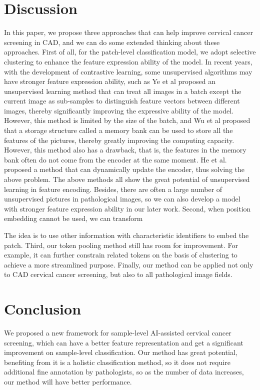 \documentclass[journal,twoside,web]{ieeecolor}
\begin{document}








\section{Discussion}\label{sec:discussion}
In this paper, we propose three approaches that can help improve cervical cancer screening in CAD, and we can do some extended thinking about these approaches. First of all, for the patch-level classification model, we adopt selective clustering to enhance the feature expression ability of the model. In recent years, with the development of contrastive learning, some unsupervised algorithms may have stronger feature expression ability, such as Ye et al\cite{ye2019unsupervised} proposed an unsupervised learning method that can treat all images in a batch except the current image as sub-samples to distinguish feature vectors between different images, thereby significantly improving the expressive ability of the model. However, this method is limited by the size of the batch, and Wu et al\cite{wu2018unsupervised} proposed that a storage structure called a memory bank can be used to store all the features of the pictures, thereby greatly improving the computing capacity. However, this method also has a drawback, that is, the features in the memory bank often do not come from the encoder at the same moment. He et al.\cite{he2020momentum} proposed a method that can dynamically update the encoder, thus solving the above problem. The above methods all show the great potential of unsupervised learning in feature encoding. Besides, there are often a large number of unsupervised pictures in pathological images, so we can also develop a model with stronger feature expression ability in our later work. Second, when position embedding cannot be used, we can transform 

The idea is to use other information with characteristic identifiers to embed the patch. Third, our token pooling method still has room for improvement. For example, it can further constrain related tokens on the basis of clustering to achieve a more streamlined purpose. Finally, our method can be applied not only to CAD cervical cancer screening, but also to all pathological image fields.

\section{Conclusion}\label{sec:conclusion}
We proposed a new framework for sample-level AI-assisted cervical cancer screening, which can have a better feature representation and get a significant improvement on sample-level classification. Our method has great potential, benefiting from it is a holistic classification method, so it does not require additional fine annotation by pathologists, so as the number of data increases, our method will have better performance.
\end{document}
